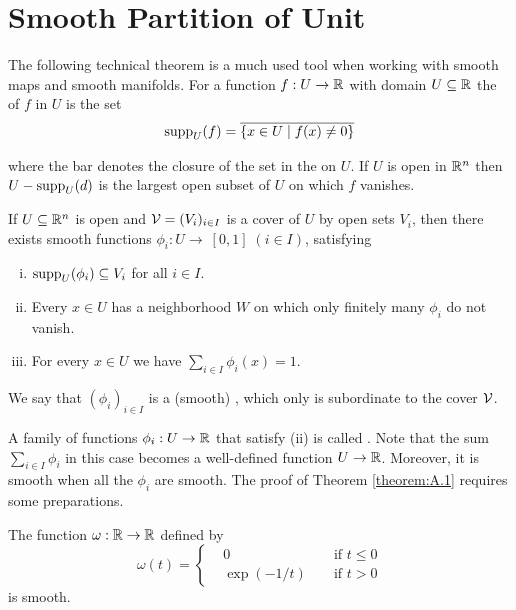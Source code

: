 \chapter{Smooth Partition of Unit}
The following technical theorem is a much used tool when working with smooth
maps and smooth manifolds.
For a function $f:U\to{\ensuremath{\mathbb{R}}}$ with domain $U\subseteq{\ensuremath{\mathbb{R}}}$ the  of $f$ in $U$ is the set
\begin{align*}
  \mathrm{supp}_U(f) = \overline{\{x\in U\mid f(x)\neq 0\}}
\end{align*}

where the bar denotes the closure of the set in the  on $U$. If $U$ is open 
in ${\mathbb{R}}^n$ then $U-\mathrm{supp}_U(d)$ is the largest open subset of $U$ on which $f$ vanishes.

\begin{theorem}\label{theorem:A.1}
  If $U\subseteq{\ensuremath{\mathbb{R}}}^n$ is open and $\mathcal{V} = (V_i)_{i\in I}$ is a cover of $U$ by open sets $V_i$, then there exists 
  smooth functions $\phi_i:U\to\ [0, 1]\; (i\in I)$, satisfying 
  \begin{enumerate}[(i)]
    \item $\mathrm{supp}_U(\phi_i)\subseteq V_i$ for all $i\in I$.
    \item Every $x\in U$ has a neighborhood $W$ on which only finitely many $\phi_i$ do not vanish.
    \item For every $x\in U$ we have $\sum_{i\in I} \phi_i(x) = 1$.
  \end{enumerate}
  We say that $(\phi_i)_{i\in I}$ is a (smooth) , which only is subordinate to the 
  cover $\mathcal{V}$.
\end{theorem}

A family of functions $\phi_i:U\to{\ensuremath{\mathbb{R}}}$ that satisfy (ii) is called . Note that
the sum $\sum_{i\in I}\phi_i$ in this case becomes a well-defined function $U\to{\ensuremath{\mathbb{R}}}$. Moreover,
it is smooth when all the $\phi_i$ are smooth. The proof of Theorem \ref{theorem:A.1} requires
some preparations.

\begin{lemma}\label{lemma:A.2}
  The function $\omega:{\mathbb{R}}\to{\ensuremath{\mathbb{R}}}$ defined by 
  \[
    \omega(t) = \left\{\begin{aligned}
      & 0 && \text{ if } t\le 0 \\
      & \exp(-1/t) && \text{ if } t>0
    \end{aligned}\right.
  \]
  is smooth.
\end{lemma}

